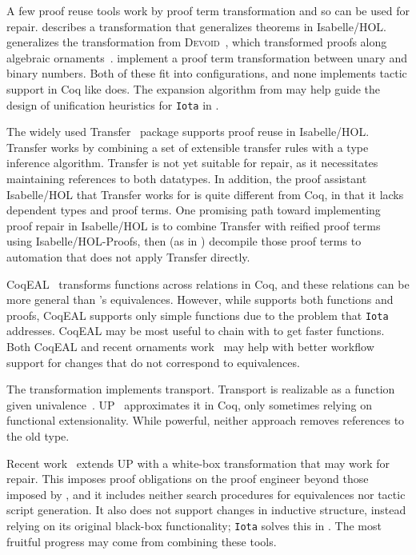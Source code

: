 A few proof reuse tools work by proof term transformation and so can be used for repair.
\citet{Johnsen2004} describes a transformation that generalizes theorems in Isabelle/HOL.
\toolname generalizes the transformation from \textsc{Devoid}~\cite{Ringer2019},
which transformed proofs along algebraic ornaments~\cite{mcbride}.
\citet{magaud2000changing} implement a proof term transformation between
unary and binary numbers. 
Both of these fit into \toolname configurations,
and none implements tactic support in Coq like \toolname does.
The expansion algorithm from \citet{magaud2000changing} may help guide the design
of unification heuristics for \lstinline{Iota} in \toolname.

The widely used Transfer~\cite{Huffman2013} package supports proof reuse in Isabelle/HOL.
Transfer works by combining a set of extensible transfer rules with a type inference algorithm.
Transfer is not yet suitable for repair, as it necessitates maintaining references to both datatypes.
In addition, the proof assistant Isabelle/HOL that Transfer works for is quite different from Coq, in that it lacks dependent types and proof terms.
One promising path toward implementing proof repair in Isabelle/HOL is to combine Transfer with reified proof terms using Isabelle/HOL-Proofs,
then (as in \toolname) decompile those proof terms to automation that does not apply Transfer directly.

CoqEAL~\cite{cohen:hal-01113453} transforms functions across relations in Coq,
and these relations can be more general than \toolname's equivalences.
However, while \toolname supports both functions and proofs, CoqEAL supports only simple functions
due to the problem that \lstinline{Iota} addresses.
CoqEAL may be most useful to chain with \toolname to get faster functions.
Both CoqEAL and recent ornaments work~\cite{williamsphd} may help with
better workflow support for changes that do not correspond to equivalences.

The \toolname transformation implements transport.
Transport is realizable as a function given univalence~\cite{univalent2013homotopy}.
UP~\cite{tabareau2017equivalences} approximates it
in Coq, only sometimes relying on functional extensionality.
While powerful, neither approach removes references to the old type. %

Recent work~\cite{tabareau2019marriage} extends UP with 
a white-box transformation that may work for repair.
This imposes proof obligations on the proof engineer beyond those imposed by \toolname,
and it includes neither search procedures for equivalences nor tactic script generation.
It also does not support changes in inductive structure,
instead relying on its original black-box functionality;
\lstinline{Iota} solves this in \toolname. %
The most fruitful progress may come from combining these tools. %

